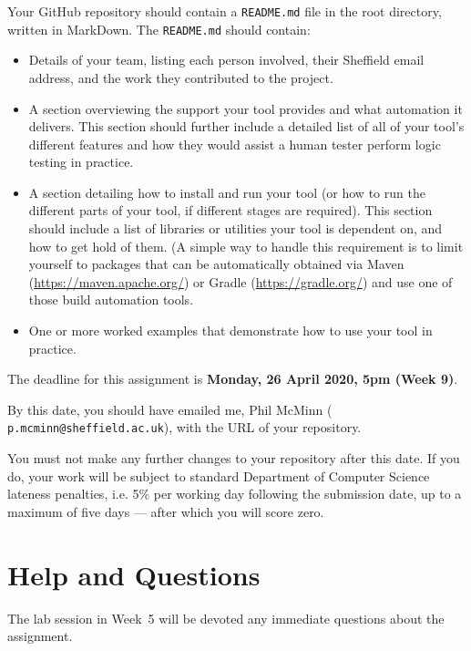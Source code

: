 Your GitHub repository should contain a {\tt README.md} file in the root
directory, written in MarkDown. The {\tt README.md} should contain:

\begin{itemize}
    \item Details of your team, listing each person involved, their Sheffield
    email address, and the work they contributed to the project. 
    
    \item A section overviewing the support your tool provides and what
    automation it delivers. This section should further include a detailed list
    of all of your tool's different features and how they would assist a human
    tester perform logic testing in practice.

    \item A section detailing how to install and run your tool (or how to run
    the different parts of your tool, if different stages are required). This
    section should include a list of libraries or utilities your tool is
    dependent on, and how to get hold of them. (A simple way to handle this
    requirement is to limit yourself to packages that can be automatically
    obtained via Maven (\url{https://maven.apache.org/}) or Gradle
    (\url{https://gradle.org/}) and use one of those build automation tools. 

    \item One or more worked examples that demonstrate how to use your tool in
    practice. 
\end{itemize}

The deadline for this assignment is {\bf Monday, 26 April 2020, 5pm (Week 9)}.

By this date, you should have emailed me, Phil McMinn ({\tt
p.mcminn@sheffield.ac.uk}), with the URL of your repository.

You must not make any further changes to your repository after this date. If you
do, your work will be subject to standard Department of Computer Science
lateness penalties, i.e. 5\% per working day following the submission date, up
to a maximum of five days --- after which you will score zero.


\section{Help and Questions}

The lab session in Week~5 will be devoted any immediate questions about the
assignment. 

